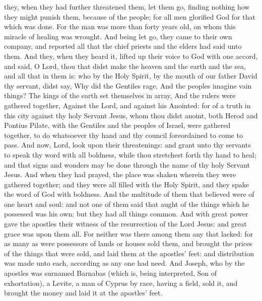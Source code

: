 they, when they had further threatened them, let them go, finding nothing how they might punish them, because of the people; for all men glorified God for that which was done. For the man was more than forty years old, on whom this miracle of healing was wrought.  And being let go, they came to their own company, and reported all that the chief priests and the elders had said unto them. And they, when they heard it, lifted up their voice to God with one accord, and said, O Lord, thou that didst make the heaven and the earth and the sea, and all that in them is: who by the Holy Spirit, by the mouth of our father David thy servant, didst say, Why did the Gentiles rage, And the peoples imagine vain things?  The kings of the earth set themselves in array, And the rulers were gathered together, Against the Lord, and against his Anointed:  for of a truth in this city against thy holy Servant Jesus, whom thou didst anoint, both Herod and Pontius Pilate, with the Gentiles and the peoples of Israel, were gathered together, to do whatsoever thy hand and thy council foreordained to come to pass. And now, Lord, look upon their threatenings: and grant unto thy servants to speak thy word with all boldness, while thou stretchest forth thy hand to heal; and that signs and wonders may be done through the name of thy holy Servant Jesus. And when they had prayed, the place was shaken wherein they were gathered together; and they were all filled with the Holy Spirit, and they spake the word of God with boldness.  And the multitude of them that believed were of one heart and soul: and not one of them said that aught of the things which he possessed was his own; but they had all things common. And with great power gave the apostles their witness of the resurrection of the Lord Jesus: and great grace was upon them all. For neither was there among them any that lacked: for as many as were possessors of lands or houses sold them, and brought the prices of the things that were sold, and laid them at the apostles’ feet: and distribution was made unto each, according as any one had need.  And Joseph, who by the apostles was surnamed Barnabas (which is, being interpreted, Son of exhortation), a Levite, a man of Cyprus by race, having a field, sold it, and brought the money and laid it at the apostles’ feet. 

